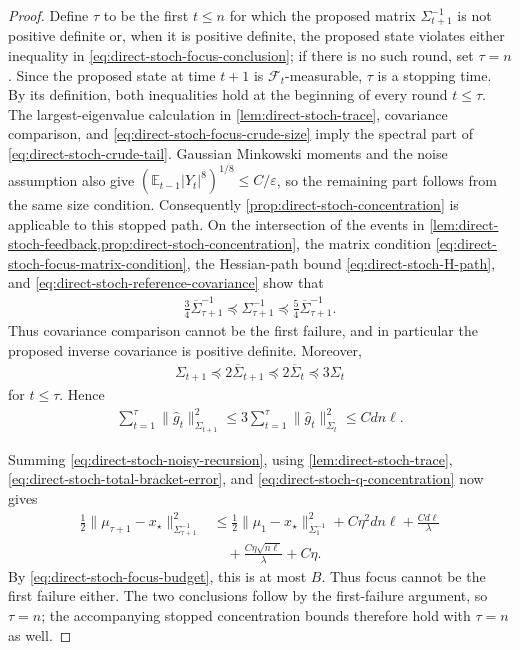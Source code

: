 \documentclass{article}
\theoremstyle{plain}
\theoremstyle{definition}
\theoremstyle{plain}
\newcommand{\E}{\mathbb E}
\begin{document}
\begin{proof}
    Define $\tau$ to be the first $t\leq n$ for which the proposed
    matrix $\Sigma_{t+1}^{-1}$ is not positive definite or, when it is
    positive definite, the proposed state violates either inequality
    in \eqref{eq:direct-stoch-focus-conclusion}; if there is no such
    round, set $\tau=n$.  Since the proposed state at time $t+1$ is
    $\mathcal F_t$-measurable, $\tau$ is a stopping time.  By its
    definition, both inequalities hold at the beginning of every round
    $t\leq\tau$.
    The largest-eigenvalue calculation in
    \cref{lem:direct-stoch-trace}, covariance comparison, and
    \eqref{eq:direct-stoch-focus-crude-size} imply the spectral part of
    \eqref{eq:direct-stoch-crude-tail}.  Gaussian Minkowski moments and
    the noise assumption also give
    $(\E_{t-1}|Y_t|^8)^{1/8}\leq C/\varepsilon$, so the remaining part
    follows from the same size condition.  Consequently
    \cref{prop:direct-stoch-concentration} is applicable to this
    stopped path.
    On the intersection of the events in
    \cref{lem:direct-stoch-feedback,prop:direct-stoch-concentration},
    the matrix condition
    \eqref{eq:direct-stoch-focus-matrix-condition}, the Hessian-path
    bound \eqref{eq:direct-stoch-H-path}, and
    \eqref{eq:direct-stoch-reference-covariance} show that
    \begin{align}
        \frac34\overline\Sigma_{\tau+1}^{-1}
        \preceq\Sigma_{\tau+1}^{-1}
        \preceq\frac54\overline\Sigma_{\tau+1}^{-1}.
    \end{align}
    Thus covariance comparison cannot be the first failure, and in
    particular the proposed inverse covariance is positive definite.
    Moreover,
    \begin{align}
        \Sigma_{t+1}
        \preceq2\overline\Sigma_{t+1}
        \preceq2\overline\Sigma_t
        \preceq3\Sigma_t
        \label{eq:direct-stoch-Sigma-next}
    \end{align}
    for $t\leq\tau$.  Hence
    \begin{align}
        \sum_{t=1}^\tau
        \|\widehat g_t\|_{\Sigma_{t+1}}^2
        \leq
        3\sum_{t=1}^\tau
        \|\widehat g_t\|_{\Sigma_t}^2
        \leq Cdn\ell.
    \end{align}

    Summing \eqref{eq:direct-stoch-noisy-recursion}, using
    \cref{lem:direct-stoch-trace},
    \eqref{eq:direct-stoch-total-bracket-error}, and
    \eqref{eq:direct-stoch-q-concentration} now gives
    \begin{align}
        \frac12\|\mu_{\tau+1}-x_\star\|_{
        \Sigma_{\tau+1}^{-1}}^2
         & \leq
        \frac12\|\mu_1-x_\star\|_{\Sigma_1^{-1}}^2
        +C\eta^2dn\ell
        +\frac{Cd\ell}{\lambda}
        \nonumber \\
         & \quad+
        \frac{C\eta\sqrt{n\ell}}{\lambda}
        +C\eta.
    \end{align}
    By \eqref{eq:direct-stoch-focus-budget}, this is at most $B$.
    Thus focus cannot be the first failure either.  The two conclusions
    follow by the first-failure argument, so $\tau=n$; the accompanying
    stopped concentration bounds therefore hold with $\tau=n$ as well.
\end{proof}
\end{document}
